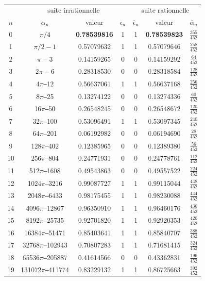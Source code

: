 \documentclass{scrartcl}
\begin{document}
\begin{table}
\begin{tabular}{|*{7}{c|}}
& \multicolumn{3}{|c|}{suite irrationnelle} 
& \multicolumn{3}{|c|}{suite rationnelle} \\
$n$ & $\alpha_n$ & valeur & $\epsilon_n$ & $\overline{\epsilon}_n$ & valeur & $\overline{\alpha}_n$ \\ 
\hline
0 & $\pi/4$ & \textbf{0.78539816} & 1 & 1 & \textbf{0.78539823} & $\frac{355}{452}$ \\
1 & $\pi/2-1$ & 0.57079632 & 1 & 1 & 0.57079646 & $\frac{258}{452}$ \\
2 & $\pi-3$ & 0.14159265 & 0 & 0 & 0.14159292 & $\frac{64}{452}$ \\
3 & $2\pi-6$ & 0.28318530 & 0 & 0 & 0.28318584 & $\frac{128}{452}$ \\
4 & 4$\pi$‒12 & 0.56637061 & 1 & 1 & 0.56637168 & $\frac{256}{452}$ \\
5 & 8$\pi$‒25 & 0.13274122 & 0 & 0 & 0.13274336 & $\frac{60}{452}$ \\
6 & 16$\pi$‒50 & 0.26548245 & 0 & 0 & 0.26548672 & $\frac{120}{452}$ \\
7 & 32$\pi$‒100 & 0.53096491 & 1 & 1 & 0.53097345 & $\frac{240}{452}$ \\
8 & 64$\pi$‒201 & 0.06192982 & 0 & 0 & 0.06194690 & $\frac{28}{452}$ \\
9 & 128$\pi$‒402 & 0.12385965 & 0 & 0 & 0.12389380 & $\frac{56}{452}$ \\
10 & 256$\pi$‒804 & 0.24771931 & 0 & 0 & 0.24778761 & $\frac{112}{452}$ \\
11 & 512$\pi$‒1608 & 0.49543863 & 0 & 0 & 0.49557522 & $\frac{224}{452}$ \\
12 & 1024$\pi$‒3216 & 0.99087727 & 1 & 1 & 0.99115044 & $\frac{448}{452}$ \\
13 & 2048$\pi$‒6433 & 0.98175455 & 1 & 1 & 0.98230088 & $\frac{444}{452}$ \\
14 & 4096$\pi$‒12867 & 0.96350910 & 1 & 1 & 0.96460176 & $\frac{436}{452}$ \\
15 & 8192$\pi$‒25735 & 0.92701820 & 1 & 1 & 0.92920353 & $\frac{420}{452}$ \\
16 & 16384$\pi$‒51471 & 0.85403641 & 1 & 1 & 0.85840707 & $\frac{388}{452}$ \\
17 & 32768$\pi$‒102943 & 0.70807283 & 1 & 1 & 0.71681415 & $\frac{324}{452}$ \\
18 & 65536$\pi$‒205887 & 0.41614566 & 0 & 0 & 0.43362831 & $\frac{196}{452}$ \\
19 & 131072$\pi$‒411774 & 0.83229132 & 1 & 1 & 0.86725663 & $\frac{392}{452}$ \\

\end{tabular}
\end{table}
\end{document}

